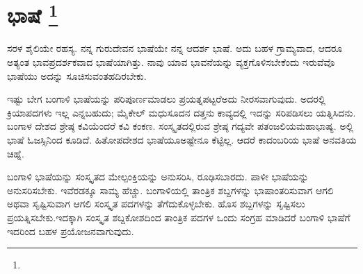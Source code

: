 
\chapter[ಭಾಷೆ ]{ಭಾಷೆ \protect\footnote{}}

ಸರಳ ಶೈಲಿಯೇ ರಹಸ್ಯ. ನನ್ನ ಗುರುದೇವನ ಭಾಷೆಯೇ ನನ್ನ ಆದರ್ಶ ಭಾಷೆ. ಅದು ಬಹಳ ಗ್ರಾಮ್ಯವಾದ, ಆದರೂ ಅತ್ಯಂತ ಭಾವಪ್ರದರ್ಶಕವಾದ ಭಾಷೆಯಾಗಿತ್ತು. ನಾವು ಯಾವ ಭಾವನೆಯನ್ನು ವ್ಯಕ್ತಗೊಳಿಸಬೇಕೆಂದು ಇರುವೆವೊ ಭಾಷೆಯು ಅದನ್ನು ಸೂಚಿಸುವಂತಹದಿರಬೇಕು.

ಇಷ್ಟು ಬೇಗ ಬಂಗಾಳಿ ಭಾಷೆಯನ್ನು ಪರಿಪೂರ್ಣಮಾಡಲು ಪ್ರಯತ್ನಪಟ್ಟರೆ\break ಅದು ನೀರಸವಾಗುವುದು. ಅದರಲ್ಲಿ ಕ್ರಿಯಾಪದಗಳು ಇಲ್ಲ ಎನ್ನಬಹುದು; ಮೈಕೇಲ್​ ಮಧುಸೂದನ ದತ್ತನು ಕಾವ್ಯದಲ್ಲಿ ಇದನ್ನು ಸರಿಪಡಿಸಲು ಯತ್ನಿಸಿದನು. ಬಂಗಾಳ ದೇಶದ ಶ್ರೇಷ್ಠ ಕವಿಯೆಂದರೆ ಕವಿ ಕಂಕಣ. ಸಂಸ್ಕೃತದಲ್ಲಿರುವ ಶ್ರೇಷ್ಠ ಗದ್ಯವೇ ಪತಂಜಲಿಯ\break ಮಹಾಭಾಷ್ಯ. ಅಲ್ಲಿ ಭಾಷೆ ಓಜಸ್ಸಿನಿಂದ ಕೂಡಿದೆ. ಹಿತೋಪದೇಶದ ಭಾಷೆಯೂ\break ಅಷ್ಟೇನೂ ಕೆಟ್ಟಿಲ್ಲ. ಆದರೆ ಕಾದಂಬರಿಯ ಭಾಷೆ ಅನವತಿಯ ಚಿಹ್ನೆ.

\eject

ಬಂಗಾಳಿ ಭಾಷೆಯನ್ನು ಸಂಸ್ಕೃತದ ಮೇಲ್ಪಂಕ್ತಿಯನ್ನು ಅನುಸರಿಸಿ, ರೂಢಿಸಬಾರದು. ಪಾಳೀ ಭಾಷೆಯನ್ನು ಅನುಸರಿಸಬೇಕು. ಇವೆರಡಕ್ಕೂ ಸಾಮ್ಯ ಹೆಚ್ಚು. ಬಂಗಾಳಿಯಲ್ಲಿ ತಾಂತ್ರಿಕ ಶಬ್ದಗಳನ್ನು ಭಾಷಾಂತರಿಸುವಾಗ ಆಗಲಿ ಅಥವಾ ಸೃಷ್ಟಿಸುವಾಗ ಆಗಲಿ ಸಂಸ್ಕೃತ ಪದಗಳನ್ನು ತೆಗೆದುಕೊಳ್ಳಬೇಕು. ಹೊಸ ಶಬ್ದಗಳನ್ನು ಸೃಷ್ಟಿಸಲು ಪ್ರಯತ್ನಿಸಬೇಕು.\break ಇದಕ್ಕಾಗಿ ಸಂಸ್ಕೃತ ಶಬ್ದಕೋಶದಿಂದ ತಾಂತ್ರಿಕ ಪದಗಳ ಒಂದು ಸಂಗ್ರಹ ಮಾಡಿದರೆ ಬಂಗಾಳಿ ಭಾಷೆಗೆ ಇದರಿಂದ ಬಹಳ ಪ್ರಯೋಜನವಾಗುವುದು.

